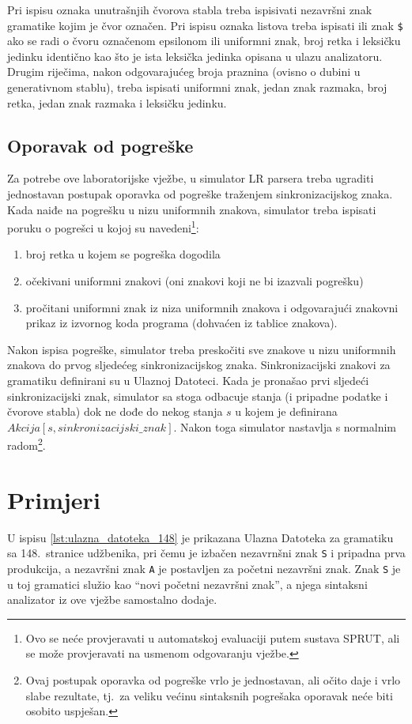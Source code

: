 \documentclass[times, 12pt, utf8]{book}
\begin{document}
Pri ispisu oznaka unutrašnjih čvorova stabla treba ispisivati nezavršni znak gramatike kojim je čvor označen.
Pri ispisu oznaka listova treba ispisati ili znak \verb|$| ako se radi o čvoru označenom epsilonom ili uniformni znak, broj retka i leksičku jedinku identično kao što je ista leksička jedinka opisana u ulazu analizatoru.
Drugim riječima, nakon odgovarajućeg broja praznina (ovisno o dubini u generativnom stablu), treba ispisati uniformni znak, jedan znak razmaka, broj retka, jedan znak razmaka i leksičku jedinku.

\subsection{Oporavak od pogreške}\label{sec:syn_oporavak}
Za potrebe ove laboratorijske vježbe, u simulator LR parsera treba ugraditi jednostavan postupak oporavka od pogreške traženjem sinkronizacijskog znaka.
Kada naiđe na pogrešku u nizu uniformnih znakova, simulator treba ispisati poruku o pogrešci u kojoj su navedeni\footnote{Ovo se neće provjeravati u automatskoj evaluaciji putem sustava SPRUT, ali se može provjeravati na usmenom odgovaranju vježbe.}:

\begin{enumerate}
\item
broj retka u kojem se pogreška dogodila
\item
očekivani uniformni znakovi (oni znakovi koji ne bi izazvali pogrešku)
\item
pročitani uniformni znak iz niza uniformnih znakova i odgovarajući znakovni prikaz iz izvornog koda programa (dohvaćen iz tablice znakova).
\end{enumerate}

Nakon ispisa pogreške, simulator treba preskočiti sve znakove u nizu uniformnih znakova do prvog sljedećeg sinkronizacijskog znaka.
Sinkronizacijski znakovi za gramatiku definirani su u Ulaznoj Datoteci.
Kada je pronašao prvi sljedeći sinkronizacijski znak, simulator sa stoga odbacuje stanja (i pripadne podatke i čvorove stabla) dok ne dođe do nekog stanja \(s\) u kojem je definirana \(Akcija[s, sinkronizacijski\_znak]\).
Nakon toga simulator nastavlja s normalnim radom\footnote{Ovaj postupak oporavka od pogreške vrlo je jednostavan, ali očito daje i vrlo slabe rezultate, tj.~za veliku većinu sintaksnih pogrešaka oporavak neće biti osobito uspješan.}.

\section{Primjeri}
U ispisu \ref{lst:ulazna_datoteka_148} je prikazana Ulazna Datoteka za gramatiku sa 148.~stranice udžbenika, pri čemu je izbačen nezavrnšni znak \texttt{S} i pripadna prva produkcija, a nezavršni znak \texttt{A} je postavljen za početni nezavršni znak.
Znak \texttt{S} je u toj gramatici služio kao ``novi početni nezavršni znak'', a njega sintaksni analizator iz ove vježbe samostalno dodaje.
\end{document}
